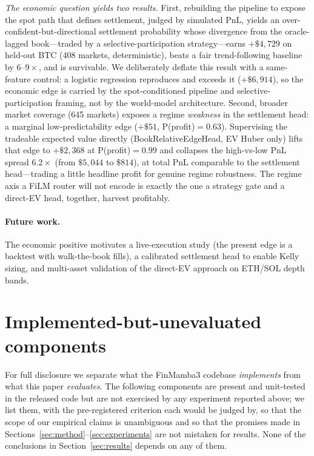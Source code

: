 \documentclass{article}
\begin{document}
\emph{The economic question yields two results.}  First, rebuilding the
pipeline to expose the spot path that defines settlement, judged by
simulated PnL, yields an over-confident-but-directional settlement
probability whose divergence from the oracle-lagged book---traded by a
selective-participation strategy---earns $+\$4{,}729$ on held-out BTC
(408 markets, deterministic), beats a fair trend-following baseline by
$6$--$9\times$, and is survivable.  We deliberately deflate this result with
a same-feature control: a logistic regression reproduces and exceeds it
($+\$6{,}914$), so the economic edge is carried by the spot-conditioned
pipeline and selective-participation framing, not by the world-model
architecture.  Second, broader market coverage
(645 markets) exposes a regime \emph{weakness} in the settlement head: a
marginal low-predictability edge ($+\$51$, P(profit)$=0.63$).  Supervising the
tradeable expected value directly (BookRelativeEdgeHead, EV Huber only) lifts
that edge to $+\$2{,}368$ at P(profit)$=0.99$ and collapses the high-vs-low PnL
spread $6.2{\times}$ (from $\$5{,}044$ to $\$814$), at total PnL comparable to
the settlement head---trading a little headline profit for genuine regime
robustness.  The regime axis a FiLM router will not encode is exactly the one a
strategy gate and a direct-EV head, together, harvest profitably.

\paragraph{Future work.}
The economic positive motivates a live-execution study (the
present edge is a backtest with walk-the-book fills), a calibrated
settlement head to enable Kelly sizing, and multi-asset validation of the
direct-EV approach on ETH/SOL depth bands.

\appendix

\section{Implemented-but-unevaluated components}\label{app:unevaluated}

For full disclosure we separate what the FinMamba3 codebase \emph{implements}
from what this paper \emph{evaluates}.  The following components are present
and unit-tested in the released code but are not exercised by any experiment
reported above; we list them, with the pre-registered criterion each would be
judged by, so that the scope of our empirical claims is unambiguous and so
that the promises made in Sections~\ref{sec:method}--\ref{sec:experiments} are
not mistaken for results.  None of the conclusions in
Section~\ref{sec:results} depends on any of them.
\end{document}
